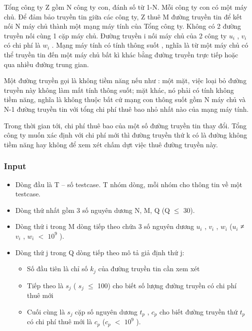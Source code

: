 

Tổng công ty Z gồm N công ty con, đánh số từ 1-N. Mỗi công ty con có một máy chủ. Để đảm bảo truyền tin giữa các công ty, Z thuê M đường truyền tin để kết nối N máy chủ thành một mạng máy tính của Tổng công ty. Không có 2 đường truyền nối cùng 1 cặp máy chủ. Đường truyền i nối máy chủ của 2 công ty $u_{i}$ , $v_{i}$ có chi phí là $w_{i}$ . Mạng máy tính có tính thông suốt , nghĩa là từ một máy chủ có thể truyền tin đến một máy chủ bất kì khác bằng đường truyền trực tiếp hoặc qua nhiều đường trung gian.

Một đường truyền gọi là không tiềm năng nếu như : một mặt, việc loại bỏ đường truyền này không làm mất tính thông suốt; mặt khác, nó phải có tính không tiềm năng, nghĩa là không thuộc bất cứ mạng con thông suốt gồm N máy chủ và N-1 đường truyền tin với tổng chi phí thuê bao nhỏ nhất nào của mạng máy tính.

Trong thời gian tới, chi phí thuê bao của một số đường truyền tin thay đổi. Tổng công ty muốn xác định với chi phí mới thì đường truyền thứ k có là đường không tiềm năng hay không để xem xét chấm dựt việc thuê đường truyền này.

\subsubsection{Input}
\begin{itemize}
	\item Dòng đầu là T – số testcase. T nhóm dòng, mỗi nhóm cho thông tin về một testcase.
	\item Dòng thứ nhất gồm 3 số nguyên dương N, M, Q (Q  $\le$  30).
	\item Dòng thứ i trong M dòng tiếp theo chứa 3 số nguyên dương $u_{i}$ , $v_{i}$ , $w_{i}$ ($u_{i}$ ≠ $v_{i}$ , $w_{i}$ $<$ $10^{9}$ ).
	\item Dòng thứ j trong Q dòng tiếp theo mô tả giả định thứ j:
\begin{itemize}
	\item Số đầu tiên là chỉ số $k_{j}$ của đường truyền tin cần xem xét
	\item Tiếp theo là $s_{j}$ ( $s_{j}$  $\le$  100) cho biết số lượng đường truyền có chi phí thuê mới
	\item Cuối cùng là $s_{j}$ cặp số nguyên dương $t_{p}$ , $c_{p}$ cho biết đường truyền thứ $t_{p}$ có chi phí thuê mới là $c_{p}$ ($c_{p}$ $<$ $10^{9}$ ).
\end{itemize}
\end{itemize}

